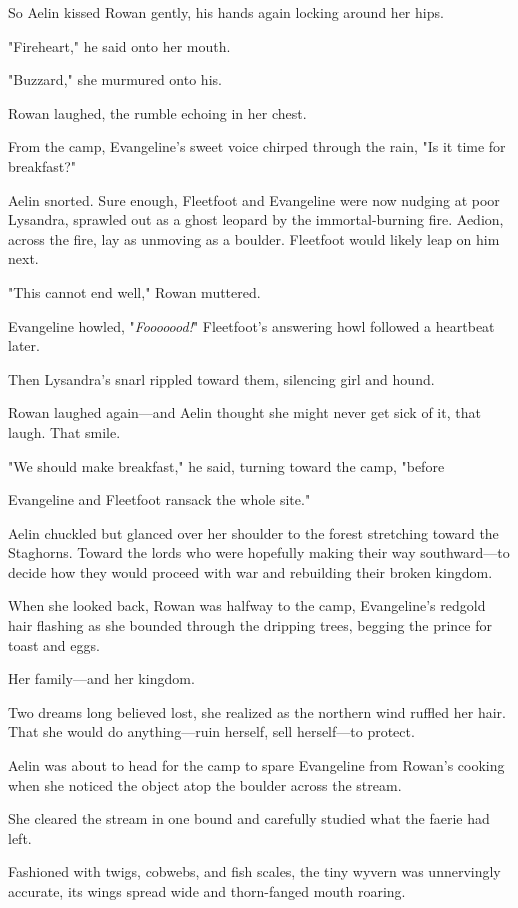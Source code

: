 So Aelin kissed Rowan gently, his hands again locking around her hips.

"Fireheart," he said onto her mouth.

"Buzzard," she murmured onto his.

Rowan laughed, the rumble echoing in her chest.

From the camp, Evangeline's sweet voice chirped through the rain, "Is it time for breakfast?"

Aelin snorted. Sure enough, Fleetfoot and Evangeline were now nudging at poor Lysandra, sprawled out as a ghost leopard by the immortal-burning fire. Aedion, across the fire, lay as unmoving as a boulder. Fleetfoot would likely leap on him next.

"This cannot end well," Rowan muttered.

Evangeline howled, "\emph{Fooooood!}" Fleetfoot's answering howl followed a heartbeat later.

Then Lysandra's snarl rippled toward them, silencing girl and hound.

Rowan laughed again---and Aelin thought she might never get sick of it, that laugh. That smile.

"We should make breakfast," he said, turning toward the camp, "before

Evangeline and Fleetfoot ransack the whole site."

Aelin chuckled but glanced over her shoulder to the forest stretching toward the Staghorns. Toward the lords who were hopefully making their way southward---to decide how they would proceed with war  and rebuilding their broken kingdom.

When she looked back, Rowan was halfway to the camp, Evangeline's redgold hair flashing as she bounded through the dripping trees, begging the prince for toast and eggs.

Her family---and her kingdom.

Two dreams long believed lost, she realized as the northern wind ruffled her hair. That she would do anything---ruin herself, sell herself---to protect.

Aelin was about to head for the camp to spare Evangeline from Rowan's cooking when she noticed the object atop the boulder across the stream.

She cleared the stream in one bound and carefully studied what the faerie had left.

Fashioned with twigs, cobwebs, and fish scales, the tiny wyvern was unnervingly accurate, its wings spread wide and thorn-fanged mouth roaring.

